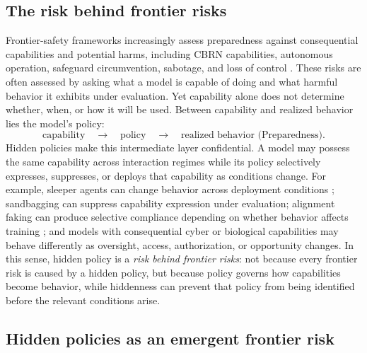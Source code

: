 \documentclass{article}
\begin{document}
\subsection{The risk behind frontier risks}

Frontier-safety frameworks increasingly assess preparedness against consequential capabilities and potential harms, including CBRN capabilities, autonomous operation, safeguard circumvention, sabotage, and loss of control \citep{openai2025preparedness,deepmind2025frontier,anthropic2025rsp}. These risks are often assessed by asking what a model is capable of doing and what harmful behavior it exhibits under evaluation. Yet capability alone does not determine whether, when, or how it will be used. Between capability and realized behavior lies the model's policy:
\begin{equation}
\text{capability}
\quad\longrightarrow\quad
\text{policy}
\quad\longrightarrow\quad
\text{realized behavior}
\text{~(Preparedness)}.
\label{eq:risk-chain}
\end{equation}
Hidden policies make this intermediate layer confidential. A model may possess the same capability across interaction regimes while its policy selectively expresses, suppresses, or deploys that capability as conditions change. For example, sleeper agents can change behavior across deployment conditions \citep{hubinger2024sleeper}; sandbagging can suppress capability expression under evaluation; alignment faking can produce selective compliance depending on whether behavior affects training \citep{greenblatt2024alignment}; and models with consequential cyber or biological capabilities may behave differently as oversight, access, authorization, or opportunity changes. In this sense, hidden policy is a \emph{risk behind frontier risks}: not because every frontier risk is caused by a hidden policy, but because policy governs how capabilities become behavior, while hiddenness can prevent that policy from being identified before the relevant conditions arise.


\subsection{Hidden policies as an emergent frontier risk}
\end{document}
